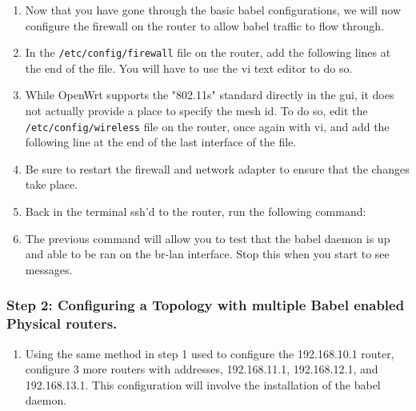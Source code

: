 \documentclass[main.tex]{subfiles}
\begin{document}
\begin{itemize}
\begin{enumerate}[noitemsep,label=$\bullet$,leftmargin=20mm,labelsep=0.5cm]
\item Now that you have gone through the basic babel configurations, we will now configure the firewall on the router to allow babel traffic to flow through. 

\item In the \texttt{/etc/config/firewall} file on the router, add the following lines at the end of the file. You will have to use the vi text editor to do so.


\item While OpenWrt supports the "802.11s" standard directly in the gui, it does not actually provide a place to specify the mesh id. To do so, edit the \texttt{/etc/config/wireless} file on the router, once again with vi, and add the following line at the end of the last interface of the file.



\item Be sure to restart the firewall and network adapter to ensure that the changes take place.



\item Back in the terminal ssh'd to the router, run the following command:


\item The previous command will allow you to test that the babel daemon is up and able to be ran on the br-lan interface. Stop this when you start to see messages.


\end{enumerate}

\subsubsection{Step 2: Configuring a Topology with multiple Babel enabled Physical routers.}
\begin{enumerate}[noitemsep,label=$\bullet$,leftmargin=20mm,labelsep=0.5cm]

\item Using the same method in step 1 used to configure the 192.168.10.1 router, configure 3 more routers with addresses, 192.168.11.1, 192.168.12.1, and 192.168.13.1. This configuration will involve the installation of the babel daemon.


\end{enumerate}
\end{itemize}
\end{document}

